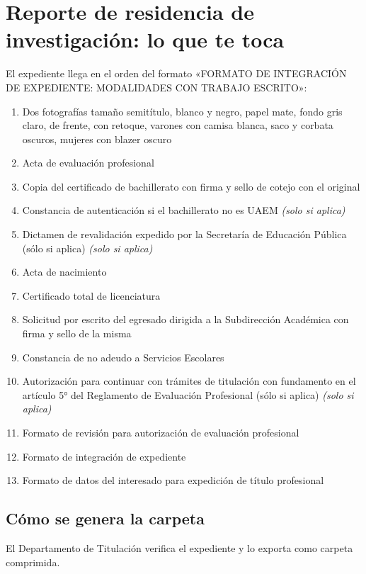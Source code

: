 \section{Reporte de residencia de investigación: lo que te toca}
El expediente llega en el orden del formato «FORMATO DE INTEGRACIÓN DE EXPEDIENTE: MODALIDADES CON TRABAJO ESCRITO»:
\begin{enumerate}
  \item Dos fotografías tamaño semitítulo, blanco y negro, papel mate, fondo gris claro, de frente, con retoque, varones con camisa blanca, saco y corbata oscuros, mujeres con blazer oscuro
  \item Acta de evaluación profesional
  \item Copia del certificado de bachillerato con firma y sello de cotejo con el original
  \item Constancia de autenticación si el bachillerato no es UAEM \emph{(solo si aplica)}
  \item Dictamen de revalidación expedido por la Secretaría de Educación Pública (sólo si aplica) \emph{(solo si aplica)}
  \item Acta de nacimiento
  \item Certificado total de licenciatura
  \item Solicitud por escrito del egresado dirigida a la Subdirección Académica con firma y sello de la misma
  \item Constancia de no adeudo a Servicios Escolares
  \item Autorización para continuar con trámites de titulación con fundamento en el artículo 5° del Reglamento de Evaluación Profesional (sólo si aplica) \emph{(solo si aplica)}
  \item Formato de revisión para autorización de evaluación profesional
  \item Formato de integración de expediente
  \item Formato de datos del interesado para expedición de título profesional
\end{enumerate}
\subsection{Cómo se genera la carpeta}
El Departamento de Titulación verifica el expediente y lo exporta como carpeta comprimida.
